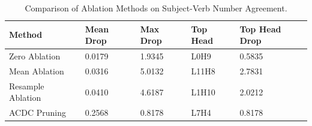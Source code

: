 \begin{table}[h]
\centering
\caption{Comparison of Ablation Methods on Subject-Verb Number Agreement.}
\label{tab:ablation_results}
\begin{tabular}{lllll}
\toprule
Method & Mean Drop & Max Drop & Top Head & Top Head Drop \\
\midrule
Zero Ablation & 0.0179 & 1.9345 & L0H9 & 0.5835 \\
Mean Ablation & 0.0316 & 5.0132 & L11H8 & 2.7831 \\
Resample Ablation & 0.0410 & 4.6187 & L1H10 & 2.0212 \\
ACDC Pruning & 0.2568 & 0.8178 & L7H4 & 0.8178 \\
\bottomrule
\end{tabular}

\end{table}
